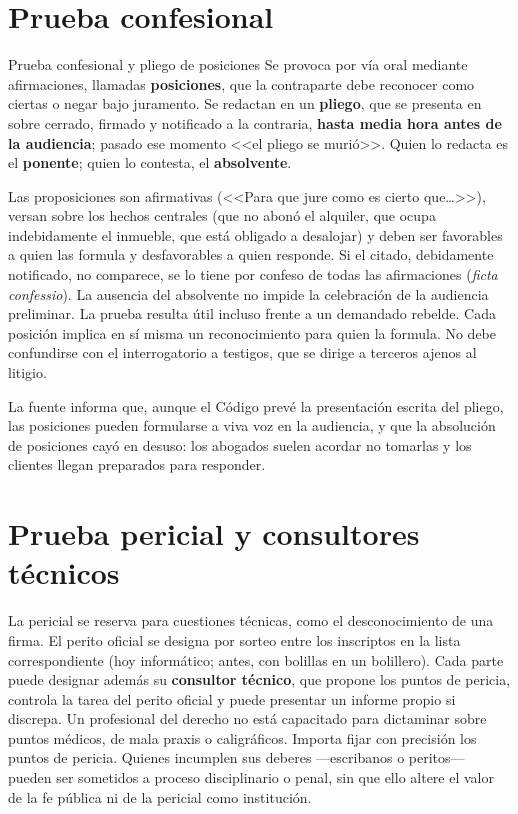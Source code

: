 \documentclass[12pt,oneside]{book}
\begin{document}
\section{Prueba confesional}

\begin{definition}{Prueba confesional y pliego de posiciones}
Se provoca por vía oral mediante afirmaciones, llamadas \textbf{posiciones}, que la contraparte debe reconocer como ciertas o negar bajo juramento. Se redactan en un \textbf{pliego}, que se presenta en sobre cerrado, firmado y notificado a la contraria, \textbf{hasta media hora antes de la audiencia}; pasado ese momento <<el pliego se murió>>. Quien lo redacta es el \textbf{ponente}; quien lo contesta, el \textbf{absolvente}.
\end{definition}

Las proposiciones son afirmativas (<<Para que jure como es cierto que\ldots>>), versan sobre los hechos centrales (que no abonó el alquiler, que ocupa indebidamente el inmueble, que está obligado a desalojar) y deben ser favorables a quien las formula y desfavorables a quien responde. Si el citado, debidamente notificado, no comparece, se lo tiene por confeso de todas las afirmaciones (\emph{ficta confessio}). La ausencia del absolvente no impide la celebración de la audiencia preliminar. La prueba resulta útil incluso frente a un demandado rebelde. Cada posición implica en sí misma un reconocimiento para quien la formula. No debe confundirse con el interrogatorio a testigos, que se dirige a terceros ajenos al litigio.

\begin{note}
La fuente informa que, aunque el Código prevé la presentación escrita del pliego, las posiciones pueden formularse a viva voz en la audiencia, y que la absolución de posiciones cayó en desuso: los abogados suelen acordar no tomarlas y los clientes llegan preparados para responder.
\end{note}

\section{Prueba pericial y consultores técnicos}

La pericial se reserva para cuestiones técnicas, como el desconocimiento de una firma. El perito oficial se designa por sorteo entre los inscriptos en la lista correspondiente (hoy informático; antes, con bolillas en un bolillero). Cada parte puede designar además su \textbf{consultor técnico}, que propone los puntos de pericia, controla la tarea del perito oficial y puede presentar un informe propio si discrepa. Un profesional del derecho no está capacitado para dictaminar sobre puntos médicos, de mala praxis o caligráficos. Importa fijar con precisión los puntos de pericia. Quienes incumplen sus deberes ---escribanos o peritos--- pueden ser sometidos a proceso disciplinario o penal, sin que ello altere el valor de la fe pública ni de la pericial como institución.
\end{document}
